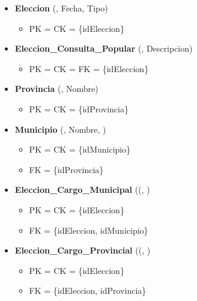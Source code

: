 \begin{itemize}
	\item \textbf{Eleccion} (, Fecha, Tipo) 
	\begin{itemize}
		\item PK = CK = \{idEleccion\}
	\end{itemize}
	\vspace{1mm}

	\item \textbf{Eleccion\_Consulta\_Popular} (, Descripcion) 
	\begin{itemize}
		\item PK = CK = FK = \{idEleccion\}
	\end{itemize}
	\vspace{1mm}

	\item \textbf{Provincia} (, Nombre) 
	\begin{itemize}
		\item PK = CK = \{idProvincia\}
	\end{itemize}
	\vspace{1mm}

	\item \textbf{Municipio} (, Nombre, ) 
	\begin{itemize}
		\item PK = CK = \{idMunicipio\}
		\item FK = \{idProvincia\}
	\end{itemize}
	\vspace{1mm}


	\item \textbf{Eleccion\_Cargo\_Municipal} ((, ) 
	\begin{itemize}
		\item PK = CK = \{idEleccion\}
		\item FK = \{idEleccion, idMunicipio\}
	\end{itemize}
	\vspace{1mm}

	\item \textbf{Eleccion\_Cargo\_Provincial} ((, ) 
	\begin{itemize}
		\item PK = CK = \{idEleccion\}
		\item FK = \{idEleccion, idProvincia\}
	\end{itemize}
	\vspace{1mm}


\end{itemize}
